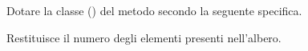 Dotare la classe  () del metodo  secondo la seguente specifica.

\begin{methodslist}

 {
  Restituisce il numero degli elementi presenti nell'albero.
}

\end{methodslist}